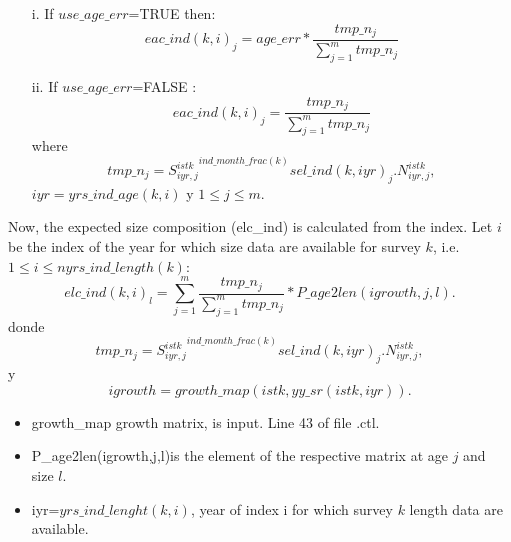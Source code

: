 \documentclass{article}
\begin{document}
\begin{itemize}
        \item [i.] If $use\_age\_err$=TRUE then: 
    \begin{equation}
        eac\_ind(k,i)_j=age\_err*\dfrac{tmp\_n_j}{\sum_{j=1}^mtmp\_n_j}
    \end{equation}
        \item [ii.] If $use\_age\_err$=FALSE :
        \begin{equation}eac\_ind(k,i)_j=\dfrac{tmp\_n_j}{\sum_{j=1}^mtmp\_n_j}
    \end{equation}
where \begin{equation}
    tmp\_n_j= {S^{istk}_{iyr,j}}^{ind\_month\_frac(k)}sel\_ind(k,iyr)_j.N^{istk}_{iyr,j},
\end{equation}
 $iyr=yrs\_ind\_age(k,i)$ y $1\leq j\leq m$.
    \end{itemize}

Now, the expected size composition (elc\_ind) is calculated from the index. Let $i$ be the index of the year for which size data are available for survey $k$, i.e.   $1\leq i \leq nyrs\_ind\_length(k)$:
\begin{equation}
    elc\_ind(k,i)_l=\sum_{j=1}^m\dfrac{tmp\_n_j}{\sum_{j=1}^mtmp\_n_j}*P\_age2len(igrowth,j,l).
\end{equation}
donde
\begin{equation}
    tmp\_n_j= {S^{istk}_{iyr,j}}^{ind\_month\_frac(k)}sel\_ind(k,iyr)_j.N^{istk}_{iyr,j},
\end{equation}
y
\begin{equation}
    igrowth=growth\_map(istk,yy\_sr(istk,iyr)).    
\end{equation}

\begin{itemize}
    \item growth\_map growth matrix, is input. Line 43 of file .ctl.
    \item P\_age2len(igrowth,j,l)is the element of the respective matrix at age $j$ and size $l$.
    \item iyr=$yrs\_ind\_lenght(k,i)$, year of index i for which survey $k$ length data are available.
    
    \end{itemize}
    
\end{document}
